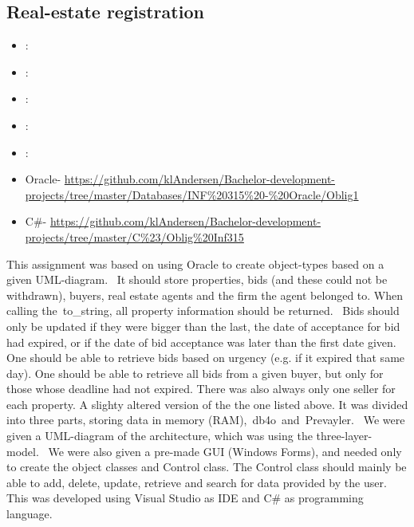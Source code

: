 \label{sec:section2}


\subsection{Real-estate registration}
\label{sec:real_estate}
\begin{itemize} 
	\item {}: 
	\item {}: 
	\item {}: 
	\item {}: 
	\item {}: 
	\item Oracle- \url{https://github.com/klAndersen/Bachelor-development-projects/tree/master/Databases/INF%20315%20-%20Oracle/Oblig1}
	\item C\#- \url{https://github.com/klAndersen/Bachelor-development-projects/tree/master/C%23/Oblig%20Inf315}
\end{itemize} 
This assignment was based on using Oracle to create object-types based on a given UML-diagram. 
It should store properties, bids (and these could not be withdrawn), buyers, real estate agents and the firm the agent belonged to.
When calling the to\_string, all property information should be returned. 
Bids should only be updated if they were bigger than the last, the date of acceptance for bid had expired, or if the date of bid acceptance was later than the first date given. 
One should be able to retrieve bids based on urgency (e.g. if it expired that same day).
One should be able to retrieve all bids from a given buyer, but only for those whose deadline had not expired. 
There was also always only one seller for each property.
\vspace{0.5em}\newline
A slighty altered version of the the one listed above. It was divided into three parts, storing data in memory (RAM), db4o and Prevayler. 
We were given a UML-diagram of the architecture, which was using the three-layer-model. 
We were also given a pre-made GUI (Windows Forms), and needed only to create the object classes and Control class. 
The Control class should mainly be able to add, delete, update, retrieve and search for data provided by the user.
This was developed using Visual Studio as IDE and C\# as programming language.

